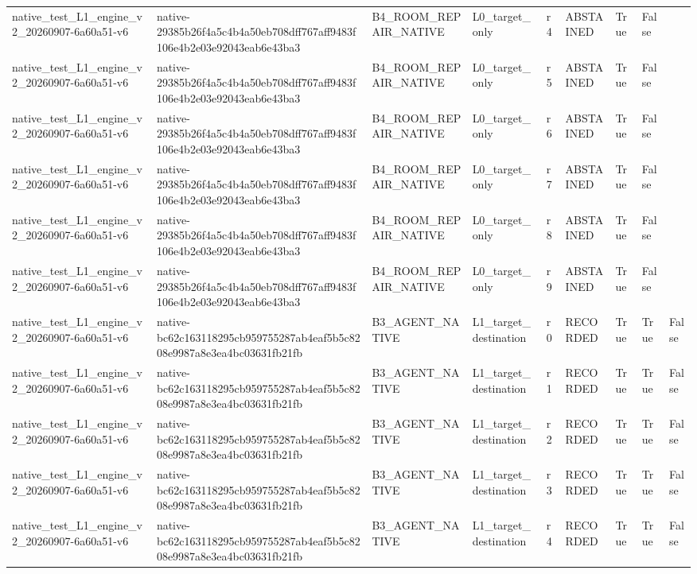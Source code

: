 \begin{tabular}{lllllllll}
native\_test\_L1\_engine\_v2\_20260907-6a60a51-v6 & native-29385b26f4a5c4b4a50eb708dff767aff9483f106e4b2e03e92043eab6e43ba3 & B4\_ROOM\_REPAIR\_NATIVE & L0\_target\_only & r4 & ABSTAINED & True & False &  \\
native\_test\_L1\_engine\_v2\_20260907-6a60a51-v6 & native-29385b26f4a5c4b4a50eb708dff767aff9483f106e4b2e03e92043eab6e43ba3 & B4\_ROOM\_REPAIR\_NATIVE & L0\_target\_only & r5 & ABSTAINED & True & False &  \\
native\_test\_L1\_engine\_v2\_20260907-6a60a51-v6 & native-29385b26f4a5c4b4a50eb708dff767aff9483f106e4b2e03e92043eab6e43ba3 & B4\_ROOM\_REPAIR\_NATIVE & L0\_target\_only & r6 & ABSTAINED & True & False &  \\
native\_test\_L1\_engine\_v2\_20260907-6a60a51-v6 & native-29385b26f4a5c4b4a50eb708dff767aff9483f106e4b2e03e92043eab6e43ba3 & B4\_ROOM\_REPAIR\_NATIVE & L0\_target\_only & r7 & ABSTAINED & True & False &  \\
native\_test\_L1\_engine\_v2\_20260907-6a60a51-v6 & native-29385b26f4a5c4b4a50eb708dff767aff9483f106e4b2e03e92043eab6e43ba3 & B4\_ROOM\_REPAIR\_NATIVE & L0\_target\_only & r8 & ABSTAINED & True & False &  \\
native\_test\_L1\_engine\_v2\_20260907-6a60a51-v6 & native-29385b26f4a5c4b4a50eb708dff767aff9483f106e4b2e03e92043eab6e43ba3 & B4\_ROOM\_REPAIR\_NATIVE & L0\_target\_only & r9 & ABSTAINED & True & False &  \\
native\_test\_L1\_engine\_v2\_20260907-6a60a51-v6 & native-bc62c163118295cb959755287ab4eaf5b5c8208e9987a8e3ea4bc03631fb21fb & B3\_AGENT\_NATIVE & L1\_target\_destination & r0 & RECORDED & True & True & False \\
native\_test\_L1\_engine\_v2\_20260907-6a60a51-v6 & native-bc62c163118295cb959755287ab4eaf5b5c8208e9987a8e3ea4bc03631fb21fb & B3\_AGENT\_NATIVE & L1\_target\_destination & r1 & RECORDED & True & True & False \\
native\_test\_L1\_engine\_v2\_20260907-6a60a51-v6 & native-bc62c163118295cb959755287ab4eaf5b5c8208e9987a8e3ea4bc03631fb21fb & B3\_AGENT\_NATIVE & L1\_target\_destination & r2 & RECORDED & True & True & False \\
native\_test\_L1\_engine\_v2\_20260907-6a60a51-v6 & native-bc62c163118295cb959755287ab4eaf5b5c8208e9987a8e3ea4bc03631fb21fb & B3\_AGENT\_NATIVE & L1\_target\_destination & r3 & RECORDED & True & True & False \\
native\_test\_L1\_engine\_v2\_20260907-6a60a51-v6 & native-bc62c163118295cb959755287ab4eaf5b5c8208e9987a8e3ea4bc03631fb21fb & B3\_AGENT\_NATIVE & L1\_target\_destination & r4 & RECORDED & True & True & False \\

\end{tabular}
